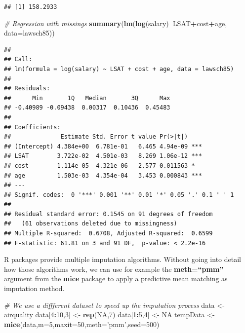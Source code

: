 \documentclass[]{book}
\newenvironment{Shaded}{\begin{snugshade}}{\end{snugshade}}
\newcommand{\CommentTok}[1]{\textcolor[rgb]{0.56,0.35,0.01}{\textit{#1}}}
\newcommand{\DataTypeTok}[1]{\textcolor[rgb]{0.13,0.29,0.53}{#1}}
\newcommand{\DecValTok}[1]{\textcolor[rgb]{0.00,0.00,0.81}{#1}}
\newcommand{\KeywordTok}[1]{\textcolor[rgb]{0.13,0.29,0.53}{\textbf{#1}}}
\newcommand{\NormalTok}[1]{#1}
\newcommand{\OperatorTok}[1]{\textcolor[rgb]{0.81,0.36,0.00}{\textbf{#1}}}
\newcommand{\OtherTok}[1]{\textcolor[rgb]{0.56,0.35,0.01}{#1}}
\newcommand{\StringTok}[1]{\textcolor[rgb]{0.31,0.60,0.02}{#1}}
\begin{document}
\begin{verbatim}
## [1] 158.2933
\end{verbatim}

\begin{Shaded}
\begin{Highlighting}[]
\CommentTok{# Regression with missings}
\KeywordTok{summary}\NormalTok{(}\KeywordTok{lm}\NormalTok{(}\KeywordTok{log}\NormalTok{(salary)}\OperatorTok{~}\NormalTok{LSAT}\OperatorTok{+}\NormalTok{cost}\OperatorTok{+}\NormalTok{age, }\DataTypeTok{data=}\NormalTok{lawsch85))}
\end{Highlighting}
\end{Shaded}

\begin{verbatim}
## 
## Call:
## lm(formula = log(salary) ~ LSAT + cost + age, data = lawsch85)
## 
## Residuals:
##      Min       1Q   Median       3Q      Max 
## -0.40989 -0.09438  0.00317  0.10436  0.45483 
## 
## Coefficients:
##              Estimate Std. Error t value Pr(>|t|)    
## (Intercept) 4.384e+00  6.781e-01   6.465 4.94e-09 ***
## LSAT        3.722e-02  4.501e-03   8.269 1.06e-12 ***
## cost        1.114e-05  4.321e-06   2.577 0.011563 *  
## age         1.503e-03  4.354e-04   3.453 0.000843 ***
## ---
## Signif. codes:  0 '***' 0.001 '**' 0.01 '*' 0.05 '.' 0.1 ' ' 1
## 
## Residual standard error: 0.1545 on 91 degrees of freedom
##   (61 observations deleted due to missingness)
## Multiple R-squared:  0.6708, Adjusted R-squared:  0.6599 
## F-statistic: 61.81 on 3 and 91 DF,  p-value: < 2.2e-16
\end{verbatim}

R packages provide multiple imputation algorithms. Without going into detail how those algorithms work, we can use for example the \textbf{meth=``pmm''} argument from the \textbf{mice} package to apply a predictive mean matching as imputation method.

\begin{Shaded}
\begin{Highlighting}[]
\CommentTok{# We use a diffferent dataset to speed up the imputation process}
\NormalTok{data <-}\StringTok{ }\NormalTok{airquality}
\NormalTok{data[}\DecValTok{4}\OperatorTok{:}\DecValTok{10}\NormalTok{,}\DecValTok{3}\NormalTok{] <-}\StringTok{ }\KeywordTok{rep}\NormalTok{(}\OtherTok{NA}\NormalTok{,}\DecValTok{7}\NormalTok{)}
\NormalTok{data[}\DecValTok{1}\OperatorTok{:}\DecValTok{5}\NormalTok{,}\DecValTok{4}\NormalTok{] <-}\StringTok{ }\OtherTok{NA}
\NormalTok{tempData <-}\StringTok{ }\KeywordTok{mice}\NormalTok{(data,}\DataTypeTok{m=}\DecValTok{5}\NormalTok{,}\DataTypeTok{maxit=}\DecValTok{50}\NormalTok{,}\DataTypeTok{meth=}\StringTok{'pmm'}\NormalTok{,}\DataTypeTok{seed=}\DecValTok{500}\NormalTok{)}
\end{Highlighting}
\end{Shaded}
\end{document}

